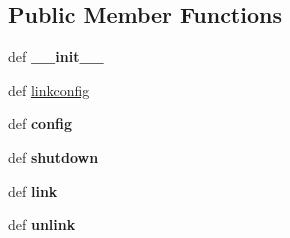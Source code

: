 \subsection*{Public Member Functions}
\begin{DoxyCompactItemize}
\item 
\hypertarget{classcore_1_1emane_1_1nodes_1_1_emane_node_a6aa557c64cf164176223ea236f712e11}{def {\bfseries \+\_\+\+\_\+init\+\_\+\+\_\+}}\label{classcore_1_1emane_1_1nodes_1_1_emane_node_a6aa557c64cf164176223ea236f712e11}

\item 
def \hyperlink{classcore_1_1emane_1_1nodes_1_1_emane_node_ad776b3aa2d00dcf59bceb8feb8e9d97d}{linkconfig}
\item 
\hypertarget{classcore_1_1emane_1_1nodes_1_1_emane_node_a9ee90347a23541f7c34e74476b08c494}{def {\bfseries config}}\label{classcore_1_1emane_1_1nodes_1_1_emane_node_a9ee90347a23541f7c34e74476b08c494}

\item 
\hypertarget{classcore_1_1emane_1_1nodes_1_1_emane_node_ab3e31a2dd15c9452afd858be8a68e4d8}{def {\bfseries shutdown}}\label{classcore_1_1emane_1_1nodes_1_1_emane_node_ab3e31a2dd15c9452afd858be8a68e4d8}

\item 
\hypertarget{classcore_1_1emane_1_1nodes_1_1_emane_node_a84909cee417c4484c0a488d6bb21c5b7}{def {\bfseries link}}\label{classcore_1_1emane_1_1nodes_1_1_emane_node_a84909cee417c4484c0a488d6bb21c5b7}

\item 
\hypertarget{classcore_1_1emane_1_1nodes_1_1_emane_node_ae70becdc5e99452043ad08ade18c4837}{def {\bfseries unlink}}\label{classcore_1_1emane_1_1nodes_1_1_emane_node_ae70becdc5e99452043ad08ade18c4837}


\end{DoxyCompactItemize}
